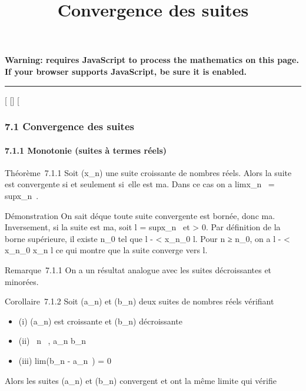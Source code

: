 \documentclass[]{article}
\title{Convergence des suites}
\author{}
\date{}
\begin{document}
\maketitle

\textbf{Warning: 
requires JavaScript to process the mathematics on this page.\\ If your
browser supports JavaScript, be sure it is enabled.}

\begin{center}\rule{3in}{0.4pt}\end{center}

{[}
{[}{]}
{[}

\subsubsection{7.1 Convergence des suites}

\paragraph{7.1.1 Monotonie (suites à termes réels)}

Théorème~7.1.1 Soit (x\_n) une suite croissante de nombres
réels. Alors la suite est convergente si et seulement si~elle est
ma. Dans ce cas on a limx\_n~
= supx\_n~.

Démonstration On sait dé que toute suite convergente est bornée, donc
ma. Inversement, si la suite est ma, soit l
= supx\_n~ et \epsilon \textgreater{} 0. Par
définition de la borne supérieure, il existe n\_0 tel que l - \epsilon
\textless{} x\_n\_0 \leq l. Pour n ≥ n\_0, on a l -
\epsilon \textless{} x\_n\_0 \leq x\_n \leq l ce qui montre
que la suite converge vers l.

Remarque~7.1.1 On a un résultat analogue avec les suites décroissantes
et minorées.

Corollaire~7.1.2 Soit (a\_n) et (b\_n) deux suites de
nombres réels vérifiant

\begin{itemize}
\itemsep1pt\parskip0pt
\item
  (i) (a\_n) est croissante et (b\_n) décroissante
\item
  (ii) \forall~n \in {}~, a\_n \leq b\_n~
\item
  (iii) lim(b\_n - a\_n~) = 0
\end{itemize}

Alors les suites (a\_n) et (b\_n) convergent et ont la
même limite \ell qui vérifie
\end{document}
